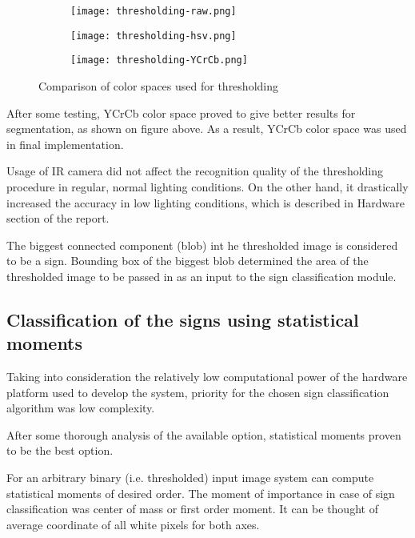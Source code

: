\begin{figure}[th!]
	\centering
	\begin{subfigure}[b]{0.3\textwidth}
		\centering
	\texttt{[image: thresholding-raw.png]}
	\end{subfigure}
	\begin{subfigure}[b]{0.3\textwidth}
		\centering
		\texttt{[image: thresholding-hsv.png]}
	\end{subfigure}
	\begin{subfigure}[b]{0.3\textwidth}
		\centering
		\texttt{[image: thresholding-YCrCb.png]}
	\end{subfigure}
	\caption{Comparison of color spaces used for thresholding}
	\label{fig:color-spaces}
\end{figure}

After some testing, YCrCb color space proved to give better results for segmentation, as shown on figure above. As a result, YCrCb color space was used in final implementation.

Usage of IR camera did not affect the recognition quality of the thresholding procedure in regular, normal lighting conditions. On the other hand, it drastically increased the accuracy in low lighting conditions, which is described in Hardware section of the report.

The biggest connected component (blob) int he thresholded image is considered to be a sign. Bounding box of the biggest blob determined the area of the thresholded image to be passed in as an input to the sign classification module. 

\subsection{Classification of the signs using statistical moments}

Taking into consideration the relatively low computational power of the hardware platform used to develop the system, priority for the chosen sign classification algorithm was low complexity.

After some thorough analysis of the available option, statistical moments proven to be the best option.

For an arbitrary binary (i.e. thresholded) input image system can compute statistical moments of desired order. The moment of importance in case of sign classification was center of mass or first order moment. It can be thought of average coordinate of all white pixels for both axes.

